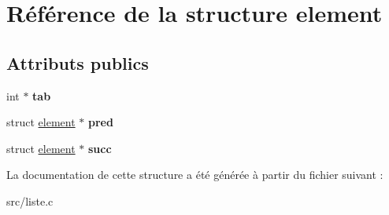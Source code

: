 \hypertarget{structelement}{}\section{Référence de la structure element}
\label{structelement}
\subsection*{Attributs publics}
\begin{DoxyCompactItemize}
\item 
\mbox{\label{structelement_afbfe1f48db349ffa752ed01823ceb382}} 
int $\ast$ {\bfseries tab}
\item 
\mbox{\label{structelement_a9f9ebee1fa1dce6d05bc325a66478635}} 
struct \mbox{\hyperlink{structelement}{element}} $\ast$ {\bfseries pred}
\item 
\mbox{\label{structelement_abe10f441a14a96bd130a004585b475ad}} 
struct \mbox{\hyperlink{structelement}{element}} $\ast$ {\bfseries succ}
\end{DoxyCompactItemize}


La documentation de cette structure a été générée à partir du fichier suivant \+:\begin{DoxyCompactItemize}
\item 
src/liste.\+c\end{DoxyCompactItemize}
